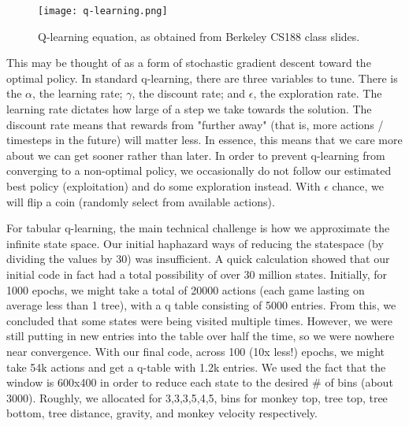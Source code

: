\documentclass[11pt]{article}
\begin{document}
\begin{figure}[htp]
\centering
\texttt{[image: q-learning.png]}
\caption{Q-learning equation, as obtained from Berkeley CS188 class slides.}
\label{fig:qequation}
\end{figure}

This may be thought of as a form of stochastic gradient descent toward the optimal policy.
In standard q-learning, there are three variables to tune.  There is the $\alpha$, the learning rate; $\gamma$, the discount rate; and $\epsilon$, the exploration rate. The learning rate dictates how large of a step we take towards the solution. 
The discount rate means that rewards from "further away" (that is, more actions / timesteps in the future) will matter less. In essence, this means that we care more about we can get sooner rather than later. 
In order to prevent q-learning from converging to a non-optimal policy, we occasionally do not follow our estimated best policy (exploitation) and do some exploration instead. With $\epsilon$ chance, we will flip a coin (randomly select from available actions).

For tabular q-learning, the main technical challenge is how we approximate the infinite state space. Our initial haphazard ways of reducing the statespace (by dividing the values by 30) was insufficient. A quick calculation showed that our initial code in fact had a total possibility of over 30 million states. Initially, for 1000 epochs, we might take a total of 20000 actions (each game lasting on average less than 1 tree), with a q table consisting of 5000 entries. From this, we concluded that some states were being visited multiple times. However, we were still putting in new entries into the table over half the time, so we were nowhere near convergence. With our final code, across 100 (10x less!) epochs, we might take 54k actions and get a q-table with 1.2k entries. We used the fact that the window is 600x400 in order to reduce each state to the desired # of bins (about 3000). Roughly, we allocated for 3,3,3,5,4,5, bins for monkey top, tree top, tree bottom, tree distance, gravity, and monkey velocity respectively. %
\end{document}
